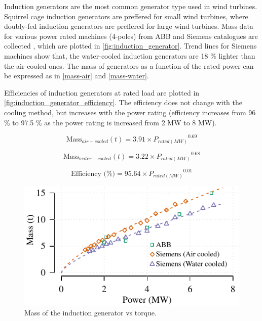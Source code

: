 \documentclass{article}\usepackage{graphicx, color}
\makeatletter
\def\maxwidth{ %
  \ifdim\Gin@nat@width>\linewidth
    \linewidth
  \else
    \Gin@nat@width
  \fi
}
\newenvironment{knitrout}{}{} %
\makeatother
\begin{document}
Induction generators are the most common generator type used in wind turbines. Squirrel cage induction generators are preffered for small wind turbines, where doubly-fed induction generators are preffered for large wind turbines. Mass data for various power rated machines (4-poles) from ABB and Siemens catalogues are collected \cite{ABB2012, Siemens}, which are plotted in \autoref{fig:induction_generator}. Trend lines for Siemens machines show that, the water-cooled induction generators are 18 \% lighter than the air-cooled ones. The mass of generators as a function of the rated power can be expressed as in \autoref{mass-air} and \autoref{mass-water}.

Efficiencies of induction generators at rated load are plotted in \autoref{fig:induction_generator_efficiency}. The efficiency does not change with the cooling method, but increases with the power rating (efficiency increases from 96 \% to 97.5 \% as the power rating is increased from 2 MW to 8 MW). 

\begin{equation}
  \text{Mass}_{air-cooled}(t) = 3.91 \times {P_{rated(MW)}}^{0.69}
  \label{mass-air}
\end{equation}

\begin{equation}
  \text{Mass}_{water-cooled}(t) = 3.22 \times {P_{rated(MW)}}^{0.68}
  \label{mass-water}
\end{equation}

\begin{equation}
\text{Efficiency (\%)} = 95.64 \times {P_{rated(MW)}}^{0.01}
\end{equation}


\begin{knitrout}
\color{fgcolor}\begin{figure}[]

\includegraphics[width=\maxwidth]{figure/induction_generator} \caption[Mass of the induction generator vs torque]{Mass of the induction generator vs torque.\label{fig:induction_generator}}
\end{figure}


\end{knitrout}
\end{document}

